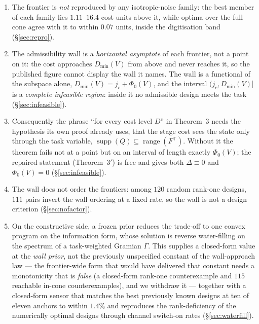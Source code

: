 \documentclass[journal]{IEEEtran}
\theoremstyle{remark}
\begin{document}
\begin{enumerate}\itemsep2pt
\item The frontier is \emph{not} reproduced by any isotropic-noise family: the
      best member of each family lies $1.11$--$16.4$ cost units above it, while
      optima over the full cone agree with it to within $0.07$ units, inside the
      digitisation band (\S\ref{sec:repro}).
\item The admissibility wall is a \emph{horizontal asymptote} of each frontier,
      not a point on it: the cost approaches $D_{\min}(V)$ from above and never
      reaches it, so the published figure cannot display the wall it names. The
      wall is a functional of the subspace alone,
      $D_{\min}(V)=j_c+\Phi_0(V)$, and the interval $(j_c,D_{\min}(V)]$ is a
      \emph{complete infeasible region}: inside it no admissible design meets the
      task (\S\ref{sec:infeasible}).
\item Consequently the phrase ``for every cost level $D$'' in Theorem~3 needs the
      hypothesis its own proof already uses, that the stage cost sees the state
      only through the task variable, $\operatorname{supp}(Q)\subseteq
      \operatorname{range}(F^{\top})$. Without it the theorem fails not at a point
      but on an interval of length exactly $\Phi_0(V)$; the repaired statement
      (Theorem~3$'$) is free and gives both $\Delta\equiv0$ and $\Phi_0(V)=0$
      (\S\ref{sec:infeasible}).
\item The wall does not order the frontiers: among $120$ random rank-one designs,
      $111$ pairs invert the wall ordering at a fixed rate, so the wall is not a
      design criterion (\S\ref{sec:nofactor}).
\item On the constructive side, a frozen prior reduces the trade-off to one convex
      program on the information form, whose solution is reverse water-filling on
      the spectrum of a task-weighted Gramian $\Gamma$. This supplies a
      closed-form value at the \emph{wall prior}, not the previously
      unspecified constant of the wall-approach law --- the frontier-wide
      form that would have delivered that constant needs a monotonicity that
      is \emph{false} (a closed-form rank-one counterexample and $115$ reachable
      in-cone counterexamples), and we withdraw it --- together with a closed-form
      sensor that
      matches the best previously known designs at ten of eleven anchors to within
      $1.4\%$ and reproduces the rank-deficiency of the numerically optimal designs
      through channel switch-on rates (\S\ref{sec:waterfill}).

\end{enumerate}
\end{document}
